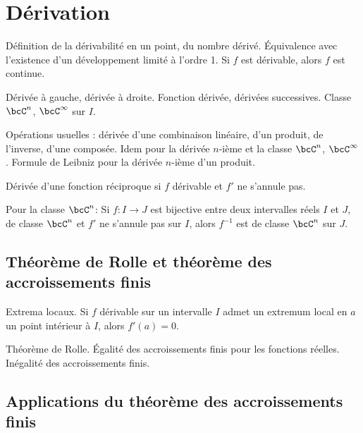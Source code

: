 \documentclass[a4paper,french,bookmarks]{article}
\begin{document}

\section*{Dérivation}

\begin{enumerate}
    \ithand Définition de la dérivabilité en un point, du nombre dérivé. Équivalence avec l'existence d'un développement limité à l'ordre 1. Si $f$ est dérivable, alors $f$ est continue.
    
    \ithand Dérivée à gauche, dérivée à droite. Fonction dérivée, dérivées successives. Classe $\bcC^n$, $\bcC^\infty$ sur $I$.
    
    \ithand Opérations usuelles : dérivée d'une combinaison linéaire, d'un produit, de l'inverse, d'une composée. Idem pour la dérivée $n$-ième et la classe  $\bcC^n$, $\bcC^\infty$. Formule de Leibniz pour la dérivée $n$-ième d'un produit.
    
    \ithand Dérivée d'une fonction réciproque si $f$ dérivable et $f'$ ne s'annule pas.
    
    Pour la classe $\bcC^n$: Si $f : I \to J$ est bijective entre deux intervalles réels $I$ et $J$, de classe $\bcC^n$ et $f'$ ne s'annule pas sur $I$, alors $f^{-1}$ est de classe $\bcC^n$ sur $J$.
\end{enumerate}

\subsection*{Théorème de Rolle et théorème des accroissements finis}

\begin{enumerate}
    \ithand Extrema locaux. Si $f$ dérivable sur un intervalle $I$ admet un extremum local en $a$ un point intérieur à $I$, alors $f'(a) = 0$.

    \ithand Théorème de Rolle. Égalité des accroissements finis pour les fonctions réelles. Inégalité des accroissements finis.
\end{enumerate}

\subsection*{Applications du théorème des accroissements finis}
\end{document}
